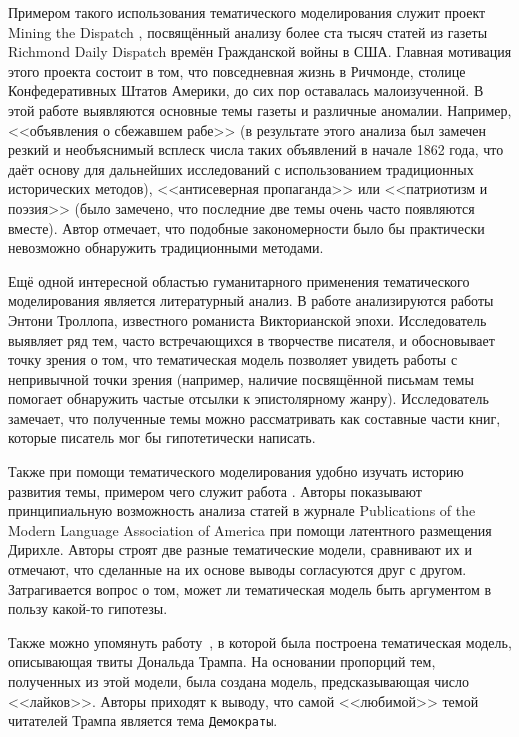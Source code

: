 Примером такого использования тематического моделирования служит проект  Mining the Dispatch \cite{monsters_men,dispatch}, посвящённый анализу более ста тысяч статей из газеты Richmond Daily Dispatch времён Гражданской войны в США. Главная мотивация этого проекта состоит в том, что повседневная жизнь в Ричмонде, столице Конфедеративных Штатов Америки, до сих пор оставалась малоизученной.
В этой работе выявляются основные темы газеты и различные аномалии. Например, <<объявления о сбежавшем рабе>> (в результате этого анализа был замечен резкий и необъяснимый всплеск числа таких объявлений в начале 1862 года, что даёт основу для дальнейших исследований с использованием традиционных исторических методов), <<антисеверная пропаганда>> или <<патриотизм и поэзия>> (было замечено, что последние две темы очень часто появляются вместе). Автор отмечает, что подобные закономерности было бы практически невозможно обнаружить традиционными методами.

Ещё одной интересной областью гуманитарного применения тематического моделирования является литературный анализ. В работе \cite{buurma2015fictionality} анализируются работы Энтони Троллопа, известного романиста Викторианской эпохи. Исследователь выявляет ряд тем, часто встречающихся в творчестве писателя, и обосновывает точку зрения о том, что тематическая модель позволяет увидеть работы с непривычной точки зрения (например, наличие посвящённой письмам темы помогает обнаружить частые отсылки к эпистолярному жанру). Исследователь замечает, что полученные темы можно рассматривать как составные части книг, которые писатель мог бы гипотетически написать.

Также при помощи тематического моделирования удобно изучать историю развития темы, примером чего служит работа \cite{goldstone2012can}. Авторы показывают принципиальную возможность анализа статей в журнале Publications of the Modern Language Association of America при помощи латентного размещения Дирихле. Авторы строят две разные тематические модели, сравнивают их и отмечают, что сделанные на их основе выводы согласуются друг с другом. Затрагивается вопрос о том, может ли тематическая модель быть аргументом в пользу какой-то гипотезы.

Также можно упомянуть работу~\cite{wang2016catching}, в которой была построена тематическая модель, описывающая твиты Дональда Трампа. На основании пропорций тем, полученных из этой модели, была создана модель, предсказывающая число <<лайков>>. Авторы приходят к выводу, что самой <<любимой>> темой читателей Трампа является тема \texttt{Демократы}.

